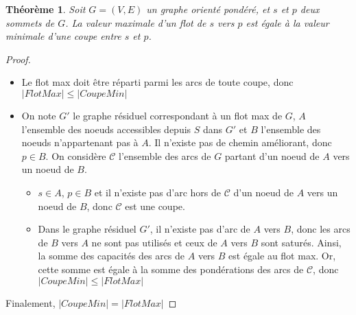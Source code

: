 \documentclass[11pt,a4paper]{article}
\newtheorem{theorem}{Théorème}[section] %
\begin{document}
\begin{theorem}
Soit \(G=(V,E)\) un graphe orienté pondéré, et \(s\) et \(p\) deux sommets de \(G\). La valeur maximale d'un flot de \(s\) vers \(p\) est égale à la valeur minimale d'une coupe entre \(s\) et \(p\).
\end{theorem}
\begin{proof}\leavevmode
  \begin{itemize}
    \item Le flot max doit être réparti parmi les arcs de toute coupe, donc \( \left| FlotMax \right| \leq \left| CoupeMin \right| \)
    \item On note \(G'\) le graphe résiduel correspondant à un flot max de \(G\), \(A\) l'ensemble des noeuds accessibles depuis \(S\) dans \(G'\) et \(B\) l'ensemble des noeuds n'appartenant pas à \(A\). Il n'existe pas de chemin améliorant, donc \(p \in B\). On considère \(\mathcal{C}\) l'ensemble des arcs de \(G\) partant d'un noeud de \(A\) vers un noeud de \(B\).
    \begin{itemize}
        \item \(s \in A\), \(p \in B\) et il n'existe pas d'arc hors de \(\mathcal{C}\) d'un noeud de \(A\) vers un noeud de \(B\), donc \(\mathcal{C}\) est une coupe.
        \item Dans le graphe résiduel \(G'\), il n'existe pas d'arc de \(A\) vers \(B\), donc les arcs de \(B\) vers \(A\) ne sont pas utilisés et ceux de \(A\) vers \(B\) sont saturés. Ainsi, la somme des capacités des arcs de \(A\) vers \(B\) est égale au flot max. Or, cette somme est égale à la somme des pondérations des arcs de \(\mathcal{C}\), donc \( \left| CoupeMin \right| \leq \left| FlotMax \right| \)
    \end{itemize}
  \end{itemize}
  Finalement, \( \left| CoupeMin \right| = \left| FlotMax \right| \)
\end{proof}
\end{document}

